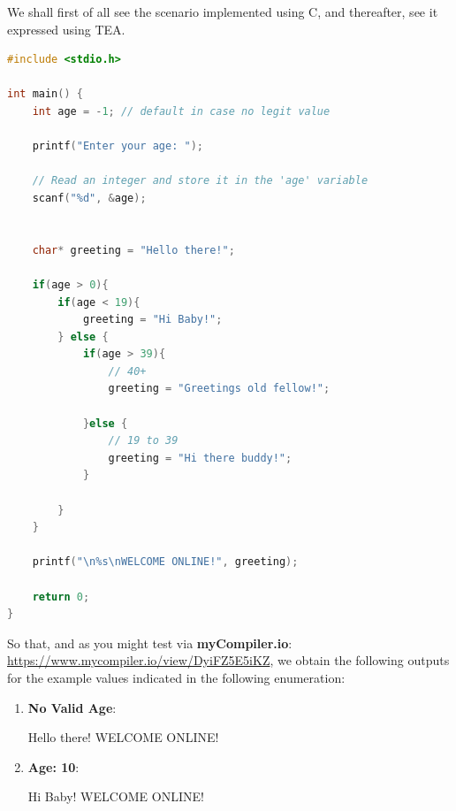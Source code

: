 \documentclass[a4paper, 18pt]{book} %
\begin{document}
{{{\begin{appendices}
\vspace{2em}

We shall first of all see the scenario implemented using C, and thereafter, see it expressed using TEA.


  \begin{tcolorbox}[myterminalstyle, title=C: Control Flow in C: If-Else: Age-Sensitive Greeting Case, breakable]
\begin{lstlisting}[language=C,
backgroundcolor=\color{codebg},
basicstyle=\ttfamily\Large\color{codefg},
commentstyle=\color{comment}\itshape,
keywordstyle=\color{keyword}\bfseries,
stringstyle=\color{string},
showstringspaces=false,breaklines=true,frame=single,label=LST_CNTRL_FLOW_C,caption={C Control Flow}]
#include <stdio.h>

int main() {
    int age = -1; // default in case no legit value

    printf("Enter your age: ");
    
    // Read an integer and store it in the 'age' variable
    scanf("%d", &age);


	char* greeting = "Hello there!";

    if(age > 0){
    	if(age < 19){
    		greeting = "Hi Baby!";
    	} else {
    		if(age > 39){
    			// 40+
    			greeting = "Greetings old fellow!";
    		
    		}else {
    			// 19 to 39
    			greeting = "Hi there buddy!";
    		}
    		
    	}
    }

    printf("\n%s\nWELCOME ONLINE!", greeting);

    return 0;
}
\end{lstlisting}
  \end{tcolorbox}


So that, and as you might test via \textbf{myCompiler.io}: \url{https://www.mycompiler.io/view/DyiFZ5E5iKZ}, we obtain the following outputs for the example values indicated in the following enumeration:


\begin{enumerate}
\item \textbf{No Valid Age}:

 \begin{tcbverbatim}
Hello there!
WELCOME ONLINE!
  \end{tcbverbatim}
  
  \item \textbf{Age: 10}:
  
   \begin{tcbverbatim}
Hi Baby!
WELCOME ONLINE!
    \end{tcbverbatim}
    

\end{enumerate}
\end{appendices}}}}
\end{document}
